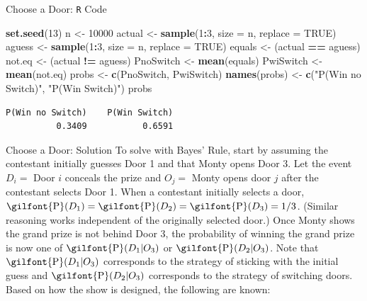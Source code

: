 \documentclass[
  ignorenonframetext,
]{beamer}
\newenvironment{Shaded}{\begin{snugshade}}{\end{snugshade}}
\newcommand{\AttributeTok}[1]{\textcolor[rgb]{0.13,0.29,0.53}{#1}}
\newcommand{\ConstantTok}[1]{\textcolor[rgb]{0.56,0.35,0.01}{#1}}
\newcommand{\DecValTok}[1]{\textcolor[rgb]{0.00,0.00,0.81}{#1}}
\newcommand{\FunctionTok}[1]{\textcolor[rgb]{0.13,0.29,0.53}{\textbf{#1}}}
\newcommand{\NormalTok}[1]{#1}
\newcommand{\OtherTok}[1]{\textcolor[rgb]{0.56,0.35,0.01}{#1}}
\newcommand{\SpecialCharTok}[1]{\textcolor[rgb]{0.81,0.36,0.00}{\textbf{#1}}}
\newcommand{\StringTok}[1]{\textcolor[rgb]{0.31,0.60,0.02}{#1}}
\begin{document}
\begin{frame}[fragile]{Choose a Door: \texttt{R} Code}
\protect\hypertarget{choose-a-door-r-code}{}
\small

\begin{Shaded}
\begin{Highlighting}[]
\FunctionTok{set.seed}\NormalTok{(}\DecValTok{13}\NormalTok{)}
\NormalTok{n }\OtherTok{\textless{}{-}} \DecValTok{10000}
\NormalTok{actual }\OtherTok{\textless{}{-}} \FunctionTok{sample}\NormalTok{(}\DecValTok{1}\SpecialCharTok{:}\DecValTok{3}\NormalTok{, }\AttributeTok{size =}\NormalTok{ n, }\AttributeTok{replace =} \ConstantTok{TRUE}\NormalTok{)}
\NormalTok{aguess }\OtherTok{\textless{}{-}} \FunctionTok{sample}\NormalTok{(}\DecValTok{1}\SpecialCharTok{:}\DecValTok{3}\NormalTok{, }\AttributeTok{size =}\NormalTok{ n, }\AttributeTok{replace =} \ConstantTok{TRUE}\NormalTok{)}
\NormalTok{equals }\OtherTok{\textless{}{-}}\NormalTok{ (actual }\SpecialCharTok{==}\NormalTok{ aguess)}
\NormalTok{not.eq }\OtherTok{\textless{}{-}}\NormalTok{ (actual }\SpecialCharTok{!=}\NormalTok{ aguess)}
\NormalTok{PnoSwitch }\OtherTok{\textless{}{-}} \FunctionTok{mean}\NormalTok{(equals)}
\NormalTok{PwiSwitch }\OtherTok{\textless{}{-}} \FunctionTok{mean}\NormalTok{(not.eq)}
\NormalTok{probs }\OtherTok{\textless{}{-}} \FunctionTok{c}\NormalTok{(PnoSwitch, PwiSwitch)}
\FunctionTok{names}\NormalTok{(probs) }\OtherTok{\textless{}{-}} \FunctionTok{c}\NormalTok{(}\StringTok{"P(Win no Switch)"}\NormalTok{, }\StringTok{"P(Win Switch)"}\NormalTok{)}
\NormalTok{probs}
\end{Highlighting}
\end{Shaded}

\begin{verbatim}
P(Win no Switch)    P(Win Switch) 
          0.3409           0.6591 
\end{verbatim}

\normalsize
\end{frame}

\begin{frame}{Choose a Door: Solution}
\protect\hypertarget{choose-a-door-solution}{}
To solve with Bayes' Rule, start by assuming the contestant initially
guesses Door 1 and that Monty opens Door 3. Let the event \(D_i=\) Door
\(i\) conceals the prize and \(O_j=\) Monty opens door \(j\) after the
contestant selects Door 1. When a contestant initially selects a door,
\(\textrm{\gilfont{P}}\normalfont (D_1)=\textrm{\gilfont{P}}\normalfont (D_2)=\textrm{\gilfont{P}}\normalfont (D_3)=1/3\).
(Similar reasoning works independent of the originally selected door.)
Once Monty shows the grand prize is not behind Door 3, the probability
of winning the grand prize is now one of
\(\textrm{\gilfont{P}}\normalfont (D_1|O_3)\) or
\(\textrm{\gilfont{P}}\normalfont (D_2|O_3)\). Note that
\(\textrm{\gilfont{P}}\normalfont (D_1|O_3)\) corresponds to the
strategy of sticking with the initial guess and
\(\textrm{\gilfont{P}}\normalfont (D_2|O_3)\) corresponds to the
strategy of switching doors. Based on how the show is designed, the
following are known:
\end{frame}
\end{document}
